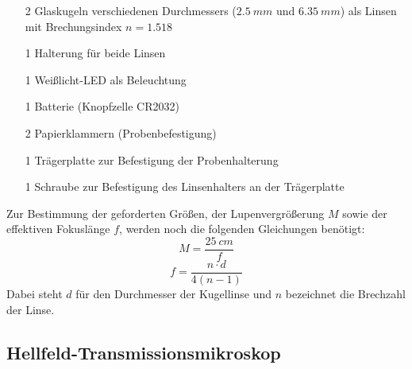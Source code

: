 \documentclass[english, ngerman]{scrartcl}
\begin{document}
%
\begin{itemize}
    \item[2] Glaskugeln verschiedenen Durchmessers ($\SI{2,5}{mm}$ und $\SI{6,35}{mm}$) als Linsen mit Brechungsindex $n=\num{1,518}$
    \item[1] Halterung für beide Linsen
    \item[1] Weißlicht-LED als Beleuchtung
    \item[1] Batterie (Knopfzelle CR2032)
    \item[2] Papierklammern (Probenbefestigung)
    \item[1] Trägerplatte zur Befestigung der Probenhalterung
    \item[1] Schraube zur Befestigung des Linsenhalters an der Trägerplatte
\end{itemize}
%
Zur Bestimmung der geforderten Größen, der Lupenvergrößerung $M$ sowie der effektiven Fokuslänge $f$, werden noch die folgenden Gleichungen benötigt:
%
\begin{equation}
    \label{eq:vergroesserung_leeuwenhoek}
    M = \frac{\SI{25}{cm}}{f}
\end{equation}
%
\begin{equation}
    \label{eq:fokuslaenge_leeuwenhoek}
    f = \frac{n \cdot d}{4(n-1)}
\end{equation}
%
Dabei steht $d$ für den Durchmesser der Kugellinse und $n$ bezeichnet die Brechzahl der Linse.


\subsection{Hellfeld-Transmissionsmikroskop}
\label{subsec:hellfeld_transmissionsmikroskop_grundlagen}
\end{document}
